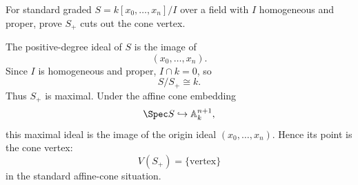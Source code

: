 \begin{problem}\label{prob:vi34-10}
For standard graded \(S=k[x_0,\ldots,x_n]/I\) over a field with \(I\) homogeneous and proper, prove \(S_+\) cuts out the cone vertex.
\end{problem}

\ifdefined\FullProblemDossiers
\begin{solution}
The positive-degree ideal of \(S\) is the image of
\[
(x_0,\ldots,x_n).
\]
Since \(I\) is homogeneous and proper, \(I\cap k=0\), so
\[
S/S_+\cong k.
\]
Thus \(S_+\) is maximal. Under the affine cone embedding
\[
\Spec S\hookrightarrow\mathbb A^{n+1}_k,
\]
this maximal ideal is the image of the origin ideal \((x_0,\ldots,x_n)\). Hence its point is the cone vertex:
\[
\boxed{V(S_+)=\{\text{vertex}\}}
\]
in the standard affine-cone situation.
\end{solution}
\fi
